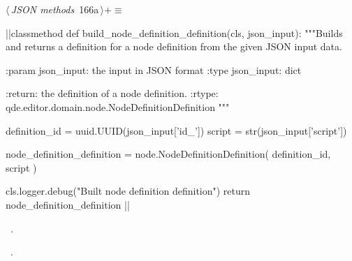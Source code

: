 \documentclass[%
    a4paper,    %
    justified,  %
    nobib,      %
    openany     %
]{tufte-book}
\begin{document}
\begin{flushleft} \small
\begin{minipage}{\linewidth}\label{scrap199}\raggedright\small
{} $\langle\,${\itshape JSON methods}\nobreak\ {\footnotesize {166a}}$\,\rangle+\equiv$
\vspace{-1ex}
\begin{pythoncode}
|\normalfont{}\fontfamily{}|classmethod
def build_node_definition_definition(cls, json_input):
    """Builds and returns a definition for a node definition from the given
    JSON input data.

    :param json_input: the input in JSON format
    :type  json_input: dict

    :return: the definition of a node definition.
    :rtype:  qde.editor.domain.node.NodeDefinitionDefinition
    """

    definition_id = uuid.UUID(json_input['id_'])
    script        = str(json_input['script'])

    node_definition_definition = node.NodeDefinitionDefinition(
        definition_id,
        script
    )

    cls.logger.debug("Built node definition definition")
    return node_definition_definition
|\NWsep|
\end{pythoncode}
\vspace{1.5ex}
\footnotesize
\begin{list}{}{\setlength{\itemsep}{-\parsep}\setlength{\itemindent}{-\leftmargin}}
\item \NWtxtMacroDefBy\ .
\item \NWtxtMacroRefIn\ .

\item{}
\end{list}
\end{minipage}\vspace{4ex}
\end{flushleft}
\end{document}
